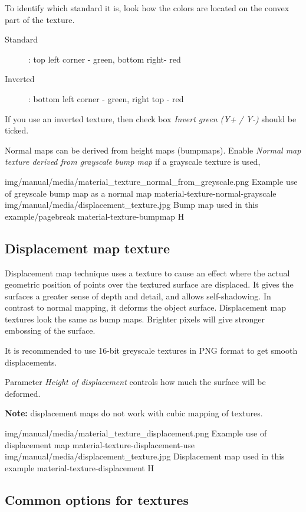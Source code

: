 To identify which standard it is, look how the colors are located on the convex part of the texture.
\begin{description}
\item[Standard]: top left corner - green, bottom right- red
\item[Inverted]: bottom left corner - green, right top - red
\end{description}
If you use an inverted texture, then check box  \emph{Invert green (Y+ / Y-)}  should be ticked.

Normal maps can be derived from height maps (bumpmaps). Enable \emph{Normal map texture derived from grayscale bump map} if a grayscale texture is used,

\twoImagesWithTwoCaptionsFullWidth
{img/manual/media/material_texture_normal_from_greyscale.png}
{Example use of greyscale bump map as a normal map}
{material-texture-normal-grayscale}
{img/manual/media/displacement_texture.jpg}
{Bump map used in this example/pagebreak}
{material-texture-bumpmap}
{H}

\subsection{Displacement map texture}\label{materials-texture-displacement}

Displacement map technique uses a texture to cause an effect where the actual geometric position of points over the textured surface are displaced. It gives the surfaces a greater sense of depth and detail, and allows self-shadowing. In contrast to normal mapping, it deforms the object surface.
Displacement map textures look the same as bump maps. Brighter pixels will give stronger embossing of the surface.

It is recommended to use 16-bit greyscale textures in PNG format to get smooth displacements.

Parameter \emph{Height of displacement} controls how much the surface will be deformed.

\textbf{Note:} displacement maps do not work with cubic mapping of textures.

\twoImagesWithTwoCaptionsFullWidth
{img/manual/media/material_texture_displacement.png}
{Example use of displacement map}
{material-texture-displacement-use}
{img/manual/media/displacement_texture.jpg}
{Displacement map used in this example}
{material-texture-displacement}
{H}

\pagebreak
\subsection{Common options for textures}\label{materials-textures}

